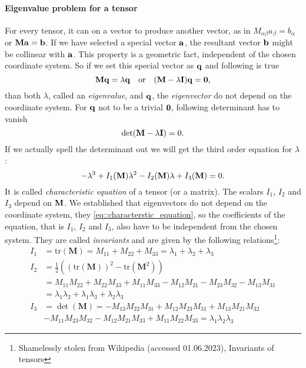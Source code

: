 \documentclass[a4paper]{article}
\begin{document}
\paragraph{Eigenvalue problem for a tensor}
For every tensor, it can  on a vector to produce another vector, as 
in \(M_{\alpha\beta}a_\beta = b_\alpha\) or \(\vb{M}\vb{a} = \vb{b}\). If we 
have selected a special vector \(\vb{a}\), the resultant vector \(\vb{b}\)
might be collinear with \(\vb{a}\). This property is a geometric fact, 
independent of the chosen coordinate system. So if we set this special
vector as \(\vb{q}\) and following is true
\[
  \vb{M}\vb{q} = \lambda\vb{q} \quad \text{or} \quad 
  \qty(\vb{M} - \lambda\vb{I})\vb{q} = \vb{0},
\]
than both \(\lambda\), called an \emph{eigenvalue}, and \(\vb{q}\), the 
\emph{eigenvector} do not depend on the coordinate system.
For \(\vb{q}\) not to be a trivial \(\vb{0}\), following determinant has to 
vanish
\[
  \det(\vb{M} - \lambda\vb{I}) = 0.
\]
If we actually spell the determinant out we will get the third order 
equation for \(\lambda\):
\begin{equation}\label{eq::characterstic_equation}
  -\lambda^3 + I_1 \qty(\vb{M})\lambda^2 - I_2\qty(\vb{M})\lambda 
  + I_3\qty(\vb{M}) = 0.
\end{equation}
It is called \emph{characteristic equation} of a tensor (or a matrix). The 
scalars \(I_1\), \(I_2\) and \(I_3\) depend on \(\vb{M}\). We established 
that eigenvectors do not depend on the coordinate system, they 
\autoref{eq::characterstic_equation}, so the coefficients of the equation,
that is \(I_1\), \(I_2\) and \(I_3\), also have to be independent from the 
chosen system. They are called \emph{invariants} and are given by the 
following relations\footnote{Shamelessly stolen from Wikipedia (accessed 
01.06.2023), Invariants of tensors}:
\begin{align*}
  I_1 &= \mathrm{tr}(\mathbf{M}) = M_{11}+M_{22}+M_{33} = \lambda_1+\lambda_2+\lambda_3 \\ 
  I_2 &= \frac{1}{2} \left( (\mathrm{tr}(\mathbf{M}))^2-\mathrm{tr} \left( \mathbf{M}^2 \right) \right) \\
      &= M_{11}M_{22}+M_{22}M_{33}+M_{11}M_{33}-M_{12}M_{21}-M_{23}M_{32}-M_{13}M_{31} \\
      &= \lambda_1 \lambda_2 + \lambda_1 \lambda_3 + \lambda_2 \lambda_3 \\
  I_3 &= \det (\mathbf{M}) = -M_{13} M_{22} M_{31} + M_{12} M_{23} M_{31} + M_{13} M_{21} M_{32} \\
      &- M_{11} M_{23} M_{32} - M_{12} M_{21} M_{33} +   M_{11} M_{22} M_{33} = \lambda_1 \lambda_2 \lambda_3
\end{align*}
\end{document}
